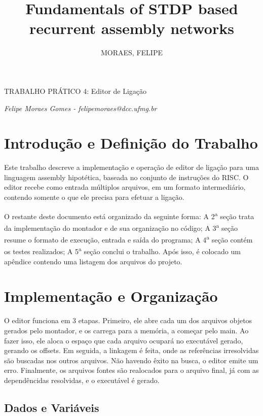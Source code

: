\documentclass[12pt, a4paper]{article}
\author{MORAES, FELIPE}
\title{Fundamentals of STDP based recurrent assembly networks}
\begin{document}
\begin{center}
{\huge TRABALHO PRÁTICO 4: Editor de Ligação}

\textit{Felipe Moraes Gomes - felipemoraes@dcc.ufmg.br}
\end{center}

\section{Introdução e Definição do Trabalho}
Este trabalho descreve a implementação e operação de editor de ligação para uma linguagem assembly hipotética, baseada no conjunto de instruções do RISC. O editor recebe como entrada múltiplos arquivos, em um formato intermediário, contendo somente o que ele precisa para efetuar a ligação.


O restante deste documento está organizado da seguinte forma: A 2\textsuperscript{a} seção trata da implementação do montador e de sua organização no código; A 3\textsuperscript{a} seção resume o formato de execução, entrada e saída do programa; A 4\textsuperscript{a} seção contém os testes realizados; A 5\textsuperscript{a} seção conclui o trabalho. Após isso, é colocado um apêndice contendo uma listagem dos arquivos do projeto. 
	
\section{Implementação e Organização}

O editor funciona em 3 etapas. Primeiro, ele abre cada um dos arquivos objetos gerados pelo montador, e os carrega para a memória, a começar pelo main. Ao fazer isso, ele aloca o espaço que cada arquivo ocupará no executável gerado, gerando os offsets. Em seguida, a linkagem é feita, onde as referências irresolvidas são buscadas nos outros arquivos. Não havendo êxito na busca, o editor emite um erro. Finalmente, os arquivos fontes são realocados para o arquivo final, já com as dependêncidas resolvidas, e o executável é gerado.

\subsection{Dados e Variáveis}
\end{document}
